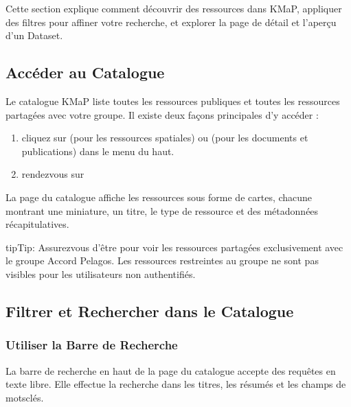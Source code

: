 \documentclass[letterpaper,10pt,english]{sphinxmanual}
\begin{document}
\sphinxAtStartPar
Cette section explique comment découvrir des ressources dans KMaP, appliquer des filtres
pour affiner votre recherche, et explorer la page de détail et l’aperçu d’un Dataset.


\subsection{Accéder au Catalogue}
\label{\detokenize{fr/02_trouver_visualiser:acceder-au-catalogue}}
\sphinxAtStartPar
Le catalogue KMaP liste toutes les ressources publiques et toutes les ressources
partagées avec votre groupe. Il existe deux façons principales d’y accéder :
\begin{enumerate}
%
\item {} 
\sphinxAtStartPar
{} \textendash{} cliquez sur  (pour les ressources
spatiales) ou  (pour les documents et publications) dans le menu du haut.

\item {} 
\sphinxAtStartPar
{} \textendash{} rendez\sphinxhyphen{}vous sur 

\end{enumerate}

\sphinxAtStartPar
La page du catalogue affiche les ressources sous forme de cartes, chacune montrant une
miniature, un titre, le type de ressource et des métadonnées récapitulatives.

\begin{sphinxadmonition}{tip}{Tip:}
\sphinxAtStartPar
Assurez\sphinxhyphen{}vous d’être  pour voir les ressources partagées exclusivement
avec le groupe Accord Pelagos. Les ressources restreintes au groupe ne sont pas
visibles pour les utilisateurs non authentifiés.
\end{sphinxadmonition}


\subsection{Filtrer et Rechercher dans le Catalogue}
\label{\detokenize{fr/02_trouver_visualiser:filtrer-et-rechercher-dans-le-catalogue}}

\subsubsection{Utiliser la Barre de Recherche}
\label{\detokenize{fr/02_trouver_visualiser:utiliser-la-barre-de-recherche}}
\sphinxAtStartPar
La barre de recherche en haut de la page du catalogue accepte des requêtes en texte
libre. Elle effectue la recherche dans les titres, les résumés et les champs de
mots\sphinxhyphen{}clés.
\end{document}
